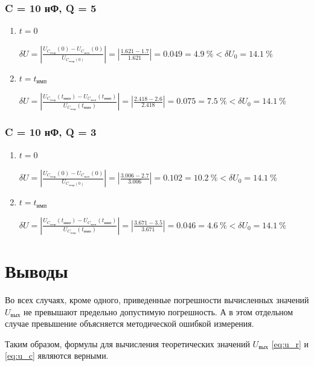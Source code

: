\subsubsection{C = 10 нФ, Q = 5}

\begin{enumerate}
\item $t = 0$

	$\delta U = \left| \frac{U_{C_\text{теор}}(0) - U_{C_\text{эксп}}(0)}{U_{C_\text{теор}(0)}} \right| = \left| \frac{1.621 - 1.7}{1.621} \right| = 0.049 = 4.9~\% < \delta U_0 = 14.1~\%$

\item $t = t_\text{имп}$

	$\delta U = \left| \frac{U_{C_\text{теор}}(t_\text{имп}) - U_{C_\text{эксп}}(t_\text{имп})}{U_{C_\text{теор}}(t_\text{имп})} \right| = \left| \frac{2.418 - 2.6}{2.418} \right| = 0.075 = 7.5~\% < \delta U_0 = 14.1~\%$
\end{enumerate}

\subsubsection{C = 10 нФ, Q = 3}

\begin{enumerate}
\item $t = 0$

	$\delta U = \left| \frac{U_{C_\text{теор}}(0) - U_{C_\text{эксп}}(0)}{U_{C_\text{теор}(0)}} \right| = \left| \frac{3.006 - 2.7}{3.006} \right| = 0.102 = 10.2~\% < \delta U_0 = 14.1~\%$

\item $t = t_\text{имп}$

	$\delta U = \left| \frac{U_{C_\text{теор}}(t_\text{имп}) - U_{C_\text{эксп}}(t_\text{имп})}{U_{C_\text{теор}}(t_\text{имп})} \right| = \left| \frac{3.671 - 3.5}{3.671} \right| = 0.046 = 4.6~\% < \delta U_0 = 14.1~\%$
\end{enumerate}
  
\section{Выводы}

Во всех случаях, кроме одного, приведенные погрешности вычисленных значений $U_\text{вых}$ не превышают предельно допустимую погрешность. А в этом отдельном случае превышение объясняется методической ошибкой измерения.

Таким образом, формулы для вычисления теоретических значений $U_\text{вых}$ \ref{eq:u_r} и \ref{eq:u_c} являются верными.

